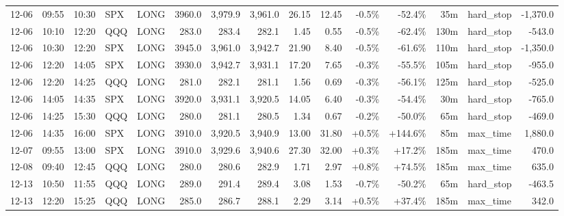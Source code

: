 \documentclass[11pt,a4paper,twoside]{article}
\begin{document}
\begin{landscape}
\begin{center}
\begin{longtable}{>{\color{txtmain}}l l l l l r r r r r r r r >{\color{txtmain}}l r}
12-06 & 09:55 & 10:30 & SPX & LONG & 3960.0 & 3,979.9 & 3,961.0 & 26.15 & 12.45 & \textcolor{lossred}{-0.5\%} & \textcolor{lossred}{-52.4\%} & 35m & hard\_stop & \textcolor{lossred}{-1,370.0} \\
12-06 & 10:10 & 12:20 & QQQ & LONG & 283.0 & 283.4 & 282.1 & 1.45 & 0.55 & \textcolor{lossred}{-0.5\%} & \textcolor{lossred}{-62.4\%} & 130m & hard\_stop & \textcolor{lossred}{-543.0} \\
12-06 & 10:30 & 12:20 & SPX & LONG & 3945.0 & 3,961.0 & 3,942.7 & 21.90 & 8.40 & \textcolor{lossred}{-0.5\%} & \textcolor{lossred}{-61.6\%} & 110m & hard\_stop & \textcolor{lossred}{-1,350.0} \\
12-06 & 12:20 & 14:05 & SPX & LONG & 3930.0 & 3,942.7 & 3,931.1 & 17.20 & 7.65 & \textcolor{lossred}{-0.3\%} & \textcolor{lossred}{-55.5\%} & 105m & hard\_stop & \textcolor{lossred}{-955.0} \\
12-06 & 12:20 & 14:25 & QQQ & LONG & 281.0 & 282.1 & 281.1 & 1.56 & 0.69 & \textcolor{lossred}{-0.3\%} & \textcolor{lossred}{-56.1\%} & 125m & hard\_stop & \textcolor{lossred}{-525.0} \\
12-06 & 14:05 & 14:35 & SPX & LONG & 3920.0 & 3,931.1 & 3,920.5 & 14.05 & 6.40 & \textcolor{lossred}{-0.3\%} & \textcolor{lossred}{-54.4\%} & 30m & hard\_stop & \textcolor{lossred}{-765.0} \\
12-06 & 14:25 & 15:30 & QQQ & LONG & 280.0 & 281.1 & 280.5 & 1.34 & 0.67 & \textcolor{lossred}{-0.2\%} & \textcolor{lossred}{-50.0\%} & 65m & hard\_stop & \textcolor{lossred}{-469.0} \\
12-06 & 14:35 & 16:00 & SPX & LONG & 3910.0 & 3,920.5 & 3,940.9 & 13.00 & 31.80 & \textcolor{wingreen}{+0.5\%} & \textcolor{wingreen}{+144.6\%} & 85m & max\_time & \textcolor{wingreen}{1,880.0} \\
12-07 & 09:55 & 13:00 & SPX & LONG & 3910.0 & 3,929.6 & 3,940.6 & 27.30 & 32.00 & \textcolor{wingreen}{+0.3\%} & \textcolor{wingreen}{+17.2\%} & 185m & max\_time & \textcolor{wingreen}{470.0} \\
12-08 & 09:40 & 12:45 & QQQ & LONG & 280.0 & 280.6 & 282.9 & 1.71 & 2.97 & \textcolor{wingreen}{+0.8\%} & \textcolor{wingreen}{+74.5\%} & 185m & max\_time & \textcolor{wingreen}{635.0} \\
12-13 & 10:50 & 11:55 & QQQ & LONG & 289.0 & 291.4 & 289.4 & 3.08 & 1.53 & \textcolor{lossred}{-0.7\%} & \textcolor{lossred}{-50.2\%} & 65m & hard\_stop & \textcolor{lossred}{-463.5} \\
12-13 & 12:20 & 15:25 & QQQ & LONG & 285.0 & 286.7 & 288.1 & 2.29 & 3.14 & \textcolor{wingreen}{+0.5\%} & \textcolor{wingreen}{+37.4\%} & 185m & max\_time & \textcolor{wingreen}{342.0} \\

\end{longtable}
\end{center}
\end{landscape}
\end{document}
